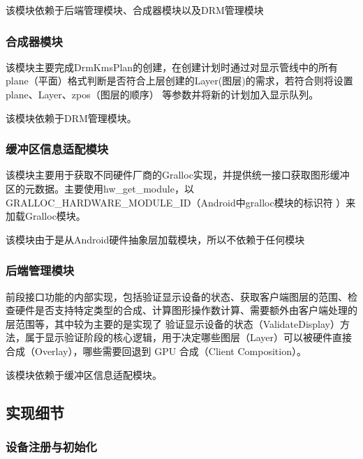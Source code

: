 该模块依赖于后端管理模块、合成器模块以及DRM管理模块

\subsubsection{合成器模块}
该模块主要完成DrmKmsPlan的创建，在创建计划时通过对显示管线中的所有plane（平面）格式判断是否符合上层创建的Layer(图层)的需求，若符合则将设置plane、Layer、zpos（图层的顺序）
等参数并将新的计划加入显示队列。

该模块依赖于DRM管理模块。

\subsubsection{缓冲区信息适配模块}
该模块主要用于获取不同硬件厂商的Gralloc实现，并提供统一接口获取图形缓冲区的元数据。主要使用hw\_get\_module，以GRALLOC\_HARDWARE\_MODULE\_ID（Android中gralloc模块的标识符
）来加载Gralloc模块。

该模块由于是从Android硬件抽象层加载模块，所以不依赖于任何模块

\subsubsection{后端管理模块}
前段接口功能的内部实现，包括验证显示设备的状态、获取客户端图层的范围、检查硬件是否支持特定类型的合成、计算图形操作数计算、需要额外由客户端处理的层范围等，其中较为主要的是实现了
验证显示设备的状态（ValidateDisplay）方法，属于显示验证阶段的核心逻辑，用于决定哪些图层（Layer）可以被硬件直接合成（Overlay），哪些需要回退到 GPU 合成（Client Composition）。

该模块依赖于缓冲区信息适配模块。

\subsection{实现细节}

\subsubsection{设备注册与初始化}


